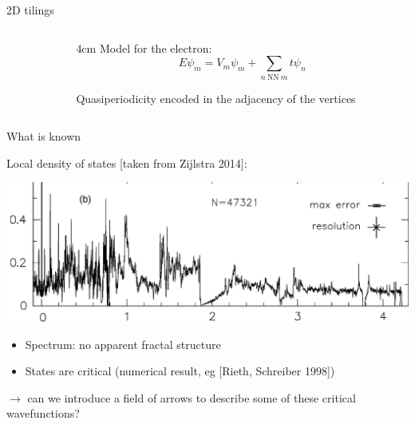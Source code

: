 \documentclass[xcolor=x11names,compress,professionalfonts, aspectratio=169]{beamer}
\renewcommand{\(}{\begin{columns}}
\renewcommand{\)}{\end{columns}}
\newcommand{\<}[1]{\begin{column}{#1}}
\renewcommand{\>}{\end{column}}
\begin{document}
\begin{frame}{2D tilings}
\begin{columns}
\begin{column}{5cm}
{}
\end{column}
\<{4cm}
Model for the electron:
\[
	E \psi_m = V_m \psi_m + \sum_{n ~\text{NN}~m} t \psi_n
\]

Quasiperiodicity encoded in the adjacency of the vertices
\>
\end{columns}

\end{frame}

\begin{frame}{What is known}

Local density of states [taken from Zijlstra 2014]:

{\centering
\includegraphics[scale=.1]{img/idos_AB_small.png}

}
\begin{itemize}
	\item Spectrum: no apparent fractal structure
	\item States are critical (numerical result, eg [Rieth, Schreiber 1998])
\end{itemize}
$\rightarrow$ can we introduce a field of arrows to describe some of these critical wavefunctions?
\end{frame}
\end{document}

